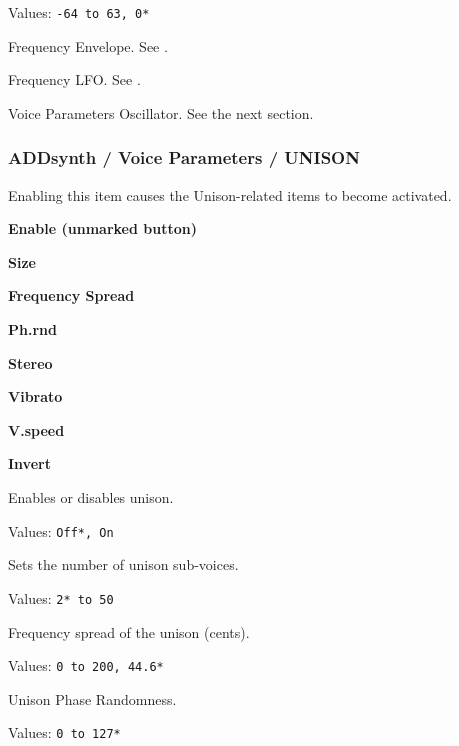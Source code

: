    Values: \texttt{-64 to 63, 0*}

   Frequency Envelope.
   See .

   Frequency LFO.
   See .

   Voice Parameters Oscillator.
   See the next section.

\subsubsection{ADDsynth / Voice Parameters / UNISON}
\label{subsubsec:addsynth_voice_parameters_unison}
   Enabling this item causes the Unison-related items to become
   activated.

   \begin{enumber}
      \item \textbf{Enable (unmarked button)}
      \item \textbf{Size}
      \item \textbf{Frequency Spread}
      \item \textbf{Ph.rnd}
      \item \textbf{Stereo}
      \item \textbf{Vibrato}
      \item \textbf{V.speed}
      \item \textbf{Invert}
   \end{enumber}

   \setcounter{ItemCounter}{0}      %

   Enables or disables unison.

   Values: \texttt{Off*, On}

   Sets the number of unison sub-voices.

   Values: \texttt{2* to 50}

   Frequency spread of the unison (cents).

   Values: \texttt{0 to 200, 44.6*}

   Unison Phase Randomness.

   Values: \texttt{0 to 127*}

